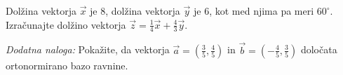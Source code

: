 \documentclass[addpoints]{exam}
\begin{document}
\begin{questions}

\begin{solution}[4cm]

\end{solution}


\newpage




    \question[4]
    Dolžina vektorja $\overrightarrow{x}$ je $8$, dolžina vektorja $\overrightarrow{y}$ je $6$, 
    kot med njima pa meri $60^\circ$. 
    Izračunajte dolžino vektorja $\overrightarrow{z}=\frac{1}{4}\overrightarrow{x}+\frac{4}{3}\overrightarrow{y}$.
        


    \begin{solution}[10cm]

    \end{solution}





    \bonusquestion[3]
    \textit{Dodatna naloga:} Pokažite, da vektorja $\overrightarrow{a}=\left(\frac{3}{5},\frac{4}{5}\right)$ in $\overrightarrow{b}=\left(-\frac{4}{5},\frac{3}{5}\right)$ določata ortonormirano bazo ravnine.

    \begin{solution}[1cm]

    \end{solution}

\end{questions}
\end{document}
